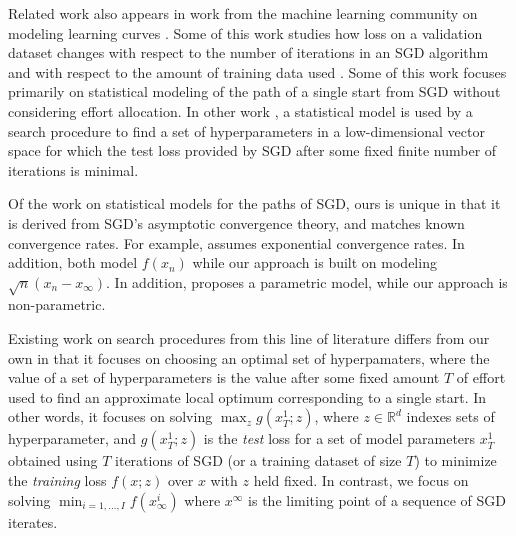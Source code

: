 \documentclass{wscpaperproc}
\newcommand{\pfcomment}[1]{{\color{red} PF: #1}}
\theoremstyle{wsc}
\begin{document}
Related work also appears in work from the machine learning community on modeling learning curves . Some of this work studies how loss on a validation dataset changes with respect to the number of iterations in an SGD algorithm  and with respect to the amount of training data used . 
Some of this work   focuses primarily on statistical modeling of the path of a single start from SGD without considering effort allocation.  In other work , a statistical model is used by a search procedure to find a set of hyperparameters in a low-dimensional vector space for which the test loss provided by SGD after some fixed finite number of iterations is minimal.  



Of the work on statistical models for the paths of SGD, ours is unique in that it is derived from SGD's asymptotic convergence theory, and matches known convergence rates.  For example,  assumes exponential convergence rates.
In addition,  both model $f(x_{n})$ while our approach is built on modeling $\sqrt{n}(x_{n}-x_{\infty})$.  In addition,  proposes a parametric model, while our approach is non-parametric.

Existing work on search procedures from this line of literature differs from our own in that it focuses on choosing an optimal set of hyperpamaters, where the value of a set of hyperparameters is the value after some fixed amount $T$ of effort used to find an approximate local optimum corresponding to a single start.  In other words, it focuses on solving $\max_z g(x^1_T;z)$, where $z\in\mathbb{R}^d$ indexes sets of hyperparameter, and $g(x^1_T;z)$ is the {\it test} loss for a set of model parameters $x^1_T$ obtained using $T$ iterations of SGD (or a training dataset of size $T$) to minimize the {\it training} loss $f(x;z)$ over $x$ with $z$ held fixed.  In contrast, we focus on solving $\min_{i=1,\ldots,I} f(x^i_\infty)$ where $x^{\infty}$ is the limiting point of a sequence of SGD iterates. 
\end{document}
